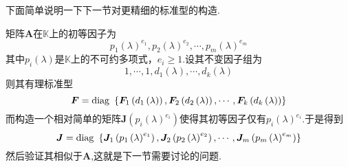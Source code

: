 下面简单说明一下下一节对更精细的标准型的构造.

矩阵$\bm{A}$在$\mathbb{K}$上的初等因子为\[
    p_1\left(\lambda\right)^{e_1},p_2\left(\lambda\right)^{e_2},\cdots,p_m\left(\lambda\right)^{e_m}
\]其中$p_i\left(\lambda\right)$是$\mathbb{K}$上的不可约多项式，$e_i\geqslant 1.$设其不变因子组为\[
    1,\cdots,1,d_1\left(\lambda\right),\cdots,d_k\left(\lambda\right)
\]则其有理标准型\[
    \bm{F}=\operatorname{diag\,} \,\left\{
    \bm{F}_1\left(d_1\left(\lambda\right)\right),\bm{F}_2\left(d_2\left(\lambda\right)\right),\cdots,\bm{F}_k\left(d_k\left(\lambda\right)\right)
    \right\}
\]而构造一个相对简单的矩阵$\bm{J}\left(p_i\left(\lambda\right)^{e_i}\right)$使得其初等因子仅有$p_i\left(\lambda\right)^{e_i}$.于是得到
\[
    \bm{J}=\operatorname{diag\,} \,\left\{
    \bm{J}_1\left(p_1\left(\lambda\right)^{e_1}\right),\bm{J}_2\left(p_2\left(\lambda\right)^{e_2}\right),\cdots,\bm{J}_m\left(p_m\left(\lambda\right)^{e_m}\right)
    \right\}
\]然后验证其相似于$\bm{A}$,这就是下一节需要讨论的问题.
